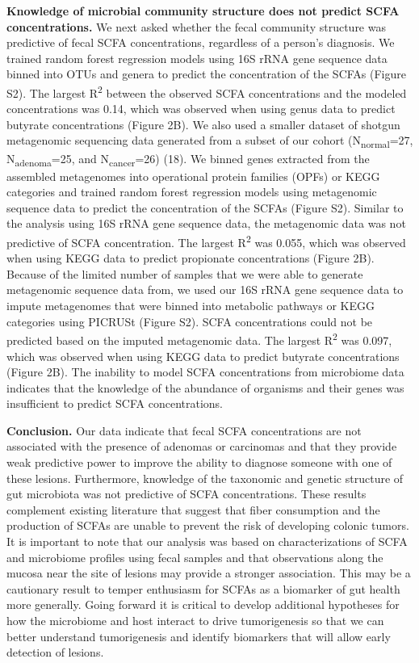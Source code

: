 \documentclass[11pt,]{article}
\begin{document}
\textbf{Knowledge of microbial community structure does not predict SCFA
concentrations.} We next asked whether the fecal community structure was
predictive of fecal SCFA concentrations, regardless of a person's
diagnosis. We trained random forest regression models using 16S rRNA
gene sequence data binned into OTUs and genera to predict the
concentration of the SCFAs (Figure S2). The largest R\textsuperscript{2}
between the observed SCFA concentrations and the modeled concentrations
was 0.14, which was observed when using genus data to predict butyrate
concentrations (Figure 2B). We also used a smaller dataset of shotgun
metagenomic sequencing data generated from a subset of our cohort
(N\textsubscript{normal}=27, N\textsubscript{adenoma}=25, and
N\textsubscript{cancer}=26) (18). We binned genes extracted from the
assembled metagenomes into operational protein families (OPFs) or KEGG
categories and trained random forest regression models using metagenomic
sequence data to predict the concentration of the SCFAs (Figure S2).
Similar to the analysis using 16S rRNA gene sequence data, the
metagenomic data was not predictive of SCFA concentration. The largest
R\textsuperscript{2} was 0.055, which was observed when using KEGG data
to predict propionate concentrations (Figure 2B). Because of the limited
number of samples that we were able to generate metagenomic sequence
data from, we used our 16S rRNA gene sequence data to impute metagenomes
that were binned into metabolic pathways or KEGG categories using
PICRUSt (Figure S2). SCFA concentrations could not be predicted based on
the imputed metagenomic data. The largest R\textsuperscript{2} was
0.097, which was observed when using KEGG data to predict butyrate
concentrations (Figure 2B). The inability to model SCFA concentrations
from microbiome data indicates that the knowledge of the abundance of
organisms and their genes was insufficient to predict SCFA
concentrations.

\textbf{Conclusion.} Our data indicate that fecal SCFA concentrations
are not associated with the presence of adenomas or carcinomas and that
they provide weak predictive power to improve the ability to diagnose
someone with one of these lesions. Furthermore, knowledge of the
taxonomic and genetic structure of gut microbiota was not predictive of
SCFA concentrations. These results complement existing literature that
suggest that fiber consumption and the production of SCFAs are unable to
prevent the risk of developing colonic tumors. It is important to note
that our analysis was based on characterizations of SCFA and microbiome
profiles using fecal samples and that observations along the mucosa near
the site of lesions may provide a stronger association. This may be a
cautionary result to temper enthusiasm for SCFAs as a biomarker of gut
health more generally. Going forward it is critical to develop
additional hypotheses for how the microbiome and host interact to drive
tumorigenesis so that we can better understand tumorigenesis and
identify biomarkers that will allow early detection of lesions.
\end{document}
